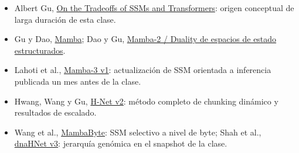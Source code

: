 \begin{itemize}
  \item Albert Gu, \href{https://goombalab.github.io/blog/2025/tradeoffs/}{On the Tradeoffs of SSMs and Transformers}: origen conceptual de larga duración de esta clase.
  \item Gu y Dao, \href{https://arxiv.org/abs/2312.00752}{Mamba}; Dao y Gu, \href{https://arxiv.org/abs/2405.21060}{Mamba-2 / Duality de espacios de estado estructurados}.
  \item Lahoti et al., \href{https://arxiv.org/abs/2603.15569v1}{Mamba-3 v1}: actualización de SSM orientada a inferencia publicada un mes antes de la clase.
  \item Hwang, Wang y Gu, \href{https://arxiv.org/abs/2507.07955v2}{H-Net v2}: método completo de chunking dinámico y resultados de escalado.
  \item Wang et al., \href{https://arxiv.org/abs/2401.13660}{MambaByte}: SSM selectivo a nivel de byte; Shah et al., \href{https://arxiv.org/abs/2602.10603v3}{dnaHNet v3}: jerarquía genómica en el snapshot de la clase.
\end{itemize}


